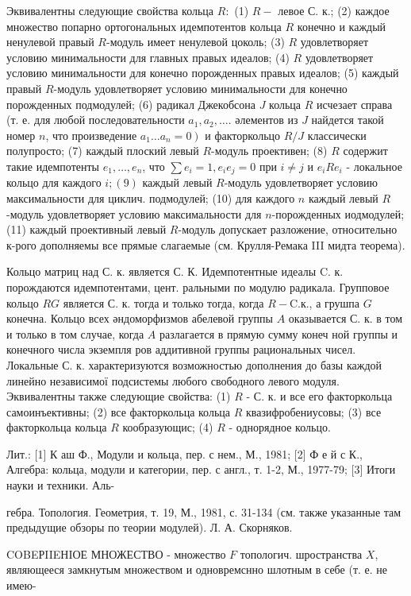 \documentclass[10pt]{article}
\begin{document}
Эквивалентны следующие свойства кольца $R:$ (1) $R-$ левое С. к.; (2) каждое множество попарно ортогональных идемпотентов кольца $R$ конечно и каждый ненулевой правый $R$-модуль имеет ненулевой цоколь; (3) $R$ удовлетворяет условию минимальности для главных правых идеалов; (4) $R$ удовлетворяет условию минимальности для конечно порожденных правых идеалов; (5) каждый правый $R$-модуль удовлетворяет условию минимальности для конечно порожденных подмодулей; (6) радикал Джекобсона $J$ кольца $R$ исчезает справа (т. е. для любой последовательности $a_{1}, a_{2}, \ldots$. әлементов из $J$ найдется такой номер $n$, что произведение $\left.a_{1} \ldots a_{n}=0\right)$ и факторкольцо $R / J$ классически полупросто; (7) каждый плоский левый $R$-модуль проективен; (8) $R$ содержит такие идемпотенты $e_{1}, \ldots, e_{n}$, что $\sum e_{i}=1, e_{i} e_{j}=0$ при $i \neq j$ и $e_{i} R e_{i}$ - локальное кольцо для каждого $i ;(9)$ каждый левый $R$-модуль удовлетворяет условию максимальности для циклич. подмодулей; (10) для каждого $n$ каждый левый $R$-модуль удовлетворяет условию максимальности для $n$-порожденных иодмодулей; (11) каждый проективный левый $R$-модуль допускает разложение, относительно к-рого дополняемы все прямые слагаемые (см. Крулля-Ремака III мидта теорема).



Кольцо матриц над С. к. является С. К. Идемпотентные идеалы C. к. порождаются идемпотентами, цент. ральными по модулю радикала. Групповое кольцо $R G$ является С. к. тогда и только тогда, когда $R-\mathrm{C}$.к., а грушпа $G$ конечна. Кольцо всех әндоморфизмов абелевой группы $A$ оказывается С. к. в том и только в том случае, когда $A$ разлагается в прямую сумму конеч ной группы и конечного числа экземпля ров аддитивной группы рациональных чисел. Локальные С. к. характеризуются возможностью дополнения до базы каждой линейно независимої подсистемы любого свободного левого модуля. Эквивалентны также следующие свойства: (1) $R$ - С. к. и все его факторкольца самоинъективны; (2) все факторкольца кольца $R$ квазифробениусовы; (3) все факторкольца кольца $R$ кообразующис; (4) $R$ - однорядное кольцо.



Лит.: [1] К аш Ф., Модули и кольца, пер. с нем., М., 1981; [2] Ф е й с К., Алгебра: кольца, модули и категории, пер. с англ., т. 1-2, М., 1977-79; [3] Итоги науки и техники. Аль-

гебра. Топология. Геометрия, т. 19, М., 1981, с. 31-134 (см. также указанные там предыдущие обзоры по теории модулей). Л. А. Скорняков.



COBEРIIEНIОЕ МНОЖЕСТВО - множество $F$ топологич. шространства $X$, являющееся замкнутым множеством и одновремснно шлотным в себе (т. е. не имею-
\end{document}
